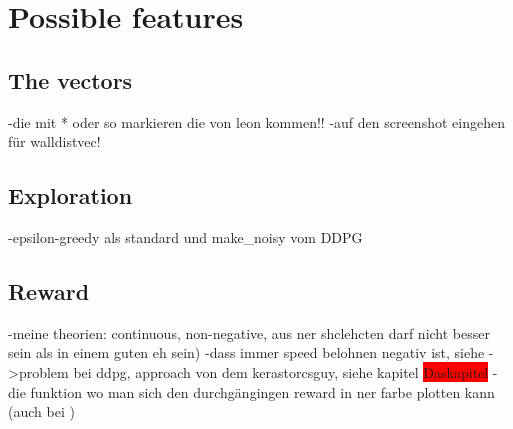 








\section{Possible features}

\label{ch:possiblefeatures}

\subsection{The vectors}

\label{ch:thevectors}
-die mit * oder so markieren die von leon kommen!!
-auf den screenshot eingehen für walldistvec!

\subsection{Exploration}

-epsilon-greedy als standard und make_noisy vom DDPG

\subsection{Reward}

-meine theorien: continuous, non-negative, aus ner shclehcten darf nicht besser sein als in einem guten eh sein)
-dass immer speed belohnen negativ ist, siehe ->problem bei ddpg, approach von dem kerastorcsguy, siehe kapitel \colorbox{red}{Daskapitel}
-die funktion wo man sich den durchgängingen reward in ner farbe plotten kann (auch bei )

